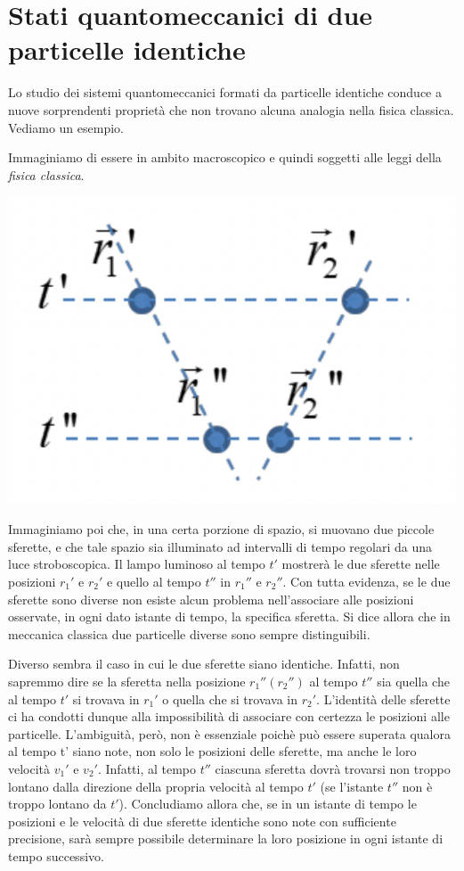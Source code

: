 \section{Stati quantomeccanici di due particelle identiche}\label{sec:particelle-identiche}

Lo studio dei sistemi quantomeccanici formati da particelle identiche conduce a nuove
sorprendenti proprietà che non trovano alcuna analogia nella fisica
classica.
Vediamo un esempio.

Immaginiamo di essere in ambito macroscopico e quindi soggetti alle
leggi della \emph{fisica classica}.
\begin{marginfigure}
    \includegraphics{figs/identical-part1}
    \label{fig:identical-part1}
\end{marginfigure}
Immaginiamo poi che, in una certa porzione di spazio, si muovano due
piccole sferette, e che tale spazio sia illuminato ad intervalli di
tempo regolari da una luce stroboscopica.
Il lampo luminoso al tempo
\(t'\) mostrerà le due sferette nelle posizioni \(r_{1}'\) e \(r_{2}'\)
e quello al tempo \(t''\) in \(r_{1}''\) e \(r_{2}''\).
Con tutta
evidenza, se le due sferette sono diverse non esiste alcun problema
nell'associare alle posizioni osservate, in ogni dato istante di tempo,
la specifica sferetta.
Si dice allora che in meccanica classica due
particelle diverse sono sempre distinguibili.

Diverso sembra il caso in cui le due sferette siano identiche.
Infatti,
non sapremmo dire se la sferetta nella posizione \(r_{1}''(r_{2}'')\) al
tempo \(t''\) sia quella che al tempo \(t'\) si trovava in \(r_{1}'\) o
quella che si trovava in \(r_{2}'\).
L'identità delle sferette ci ha
condotti dunque alla impossibilità di associare con certezza le
posizioni alle particelle.
L'ambiguità, però, non è essenziale poichè
può essere superata qualora al tempo t' siano note, non solo le
posizioni delle sferette, ma anche le loro velocità \(v_1'\) e \(v_2'\).
Infatti, al tempo \(t''\) ciascuna sferetta dovrà trovarsi non troppo
lontano dalla direzione della propria velocità al tempo \(t'\) (se
l'istante \(t''\) non è troppo lontano da \(t'\)).
Concludiamo allora
che, se in un istante di tempo le posizioni e le velocità di due
sferette identiche sono note con sufficiente precisione, sarà sempre
possibile determinare la loro posizione in ogni istante di tempo
successivo.

